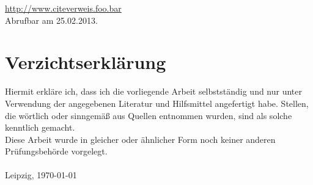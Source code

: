 \documentclass[a4paper,12pt]{scrartcl}
\begin{document}
\renewcommand\refname{Quellenverzeichnis}
\begin{thebibliography}{999}

\url{http://www.citeverweis.foo.bar}
\\Abrufbar am 25.02.2013.

\end{thebibliography}

\clearpage
\section{Verzichtserkl\"arung}
\thispagestyle{plain}

Hiermit erkläre ich, dass ich die vorliegende Arbeit selbstständig und nur unter Verwendung der angegebenen Literatur und Hilfsmittel angefertigt habe.
Stellen, die wörtlich oder sinngemäß aus Quellen entnommen wurden, sind als solche
kenntlich gemacht.\\

Diese Arbeit wurde in gleicher oder ähnlicher Form noch keiner anderen Prüfungsbehörde vorgelegt.\\\\

Leipzig, \today
\end{document}
